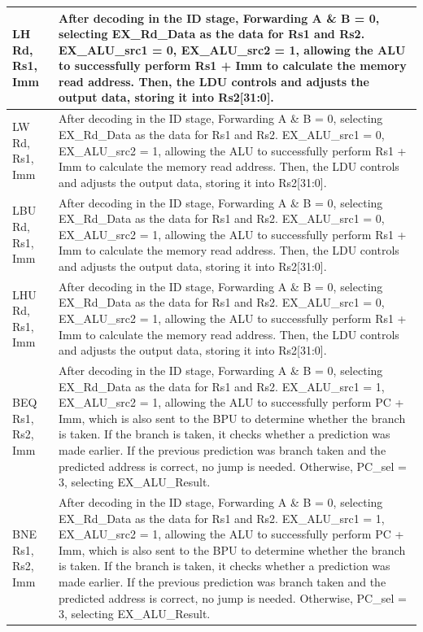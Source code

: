 \documentclass[12pt,a4paper]{report}
\begin{document}
\begin{longtable}{|l|p{12cm}|}
LH Rd, Rs1, Imm & After decoding in the ID stage, Forwarding A \& B = 0, selecting EX\_Rd\_Data as the data for Rs1 and Rs2. EX\_ALU\_src1 = 0, EX\_ALU\_src2 = 1, allowing the ALU to successfully perform Rs1 + Imm to calculate the memory read address. Then, the LDU controls and adjusts the output data, storing it into Rs2[31:0]. \\
\hline

LW Rd, Rs1, Imm & After decoding in the ID stage, Forwarding A \& B = 0, selecting EX\_Rd\_Data as the data for Rs1 and Rs2. EX\_ALU\_src1 = 0, EX\_ALU\_src2 = 1, allowing the ALU to successfully perform Rs1 + Imm to calculate the memory read address. Then, the LDU controls and adjusts the output data, storing it into Rs2[31:0]. \\
\hline

LBU Rd, Rs1, Imm & After decoding in the ID stage, Forwarding A \& B = 0, selecting EX\_Rd\_Data as the data for Rs1 and Rs2. EX\_ALU\_src1 = 0, EX\_ALU\_src2 = 1, allowing the ALU to successfully perform Rs1 + Imm to calculate the memory read address. Then, the LDU controls and adjusts the output data, storing it into Rs2[31:0]. \\
\hline

LHU Rd, Rs1, Imm & After decoding in the ID stage, Forwarding A \& B = 0, selecting EX\_Rd\_Data as the data for Rs1 and Rs2. EX\_ALU\_src1 = 0, EX\_ALU\_src2 = 1, allowing the ALU to successfully perform Rs1 + Imm to calculate the memory read address. Then, the LDU controls and adjusts the output data, storing it into Rs2[31:0]. \\
\hline

BEQ Rs1, Rs2, Imm & After decoding in the ID stage, Forwarding A \& B = 0, selecting EX\_Rd\_Data as the data for Rs1 and Rs2. EX\_ALU\_src1 = 1, EX\_ALU\_src2 = 1, allowing the ALU to successfully perform PC + Imm, which is also sent to the BPU to determine whether the branch is taken. If the branch is taken, it checks whether a prediction was made earlier. If the previous prediction was branch taken and the predicted address is correct, no jump is needed. Otherwise, PC\_sel = 3, selecting EX\_ALU\_Result. \\
\hline

BNE Rs1, Rs2, Imm & After decoding in the ID stage, Forwarding A \& B = 0, selecting EX\_Rd\_Data as the data for Rs1 and Rs2. EX\_ALU\_src1 = 1, EX\_ALU\_src2 = 1, allowing the ALU to successfully perform PC + Imm, which is also sent to the BPU to determine whether the branch is taken. If the branch is taken, it checks whether a prediction was made earlier. If the previous prediction was branch taken and the predicted address is correct, no jump is needed. Otherwise, PC\_sel = 3, selecting EX\_ALU\_Result. \\
\hline


\end{longtable}
\end{document}
